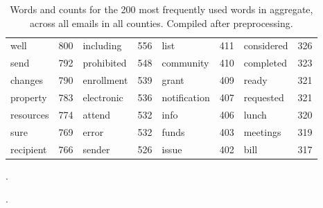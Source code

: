 \documentclass{pnastwo}
\begin{document}
\begin{article}
\begin{table*}
\begin{tabular}{lr|lr|lr|lr}
   well &  800 & including & 556 & list & 411 & considered & 326 \\ 
   send &  792 & prohibited & 548 & community & 410 & completed & 323 \\ 
   changes &  790 & enrollment & 539 & grant & 409 & ready & 321 \\ 
   property &  783 & electronic & 536 & notification & 407 & requested & 321 \\ 
   resources &  774 & attend & 532 & info & 406 & lunch & 320 \\ 
   sure &  769 & error & 532 & funds & 403 & meetings & 319 \\ 
   recipient &  766 & \cellcolor{lred} sender & 526 & issue & 402 & bill & 317 \\ 
   \bottomrule
\end{tabular}
\caption{\label{tab: top words} Words and counts for the 200 most frequently used words in aggregate, across all emails in all counties. Compiled after preprocessing.\\ \bigskip}
\end{table*}

.

\clearpage 
.


\end{article}
\end{document}
